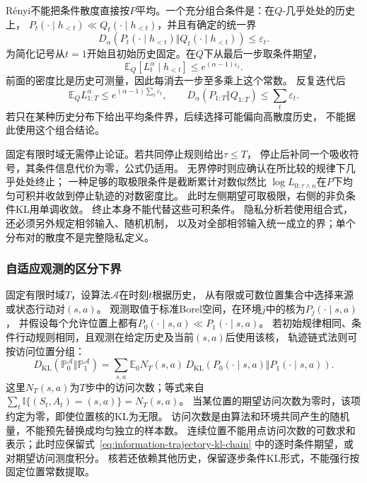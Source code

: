 Rényi不能把条件散度直接按\(P\)平均。一个充分组合条件是：在\(Q\)-几乎处处的历史上，
\(P_t(\cdot\mid h_{<t})\ll Q_t(\cdot\mid h_{<t})\)，并且有确定的统一界
\[
  D_\alpha(P_t(\cdot\mid h_{<t})\Vert Q_t(\cdot\mid h_{<t}))
  \leq\varepsilon_t.
\]
为简化记号从\(t=1\)开始且初始历史固定。在\(Q\)下从最后一步取条件期望，
\[
  \mathbb E_Q[L_t^\alpha\mid h_{<t}]
       \leq e^{(\alpha-1)\varepsilon_t}.
\]
前面的密度比是历史可测量，因此每消去一步至多乘上这个常数。
反复迭代后
\[
  \mathbb E_Q L_{1:T}^{\alpha}
  \leq e^{(\alpha-1)\sum_t\varepsilon_t},\qquad
  D_\alpha(P_{1:T}\Vert Q_{1:T})\leq\sum_t\varepsilon_t.
\]
若只在某种历史分布下给出平均条件界，后续选择可能偏向高散度历史，
不能据此使用这个组合结论。

固定有限时域无需停止论证。若共同停止规则给出\(\tau\leq T\)，
停止后补同一个吸收符号，其条件信息代价为零，公式仍适用。
无界停时则应确认在所比较的规律下几乎处处终止；
一种足够的取极限条件是截断累计对数似然比
\(\log L_{0:\tau\wedge n}\)在\(P\)下均匀可积并收敛到停止轨迹的对数密度比。
此时左侧期望可取极限，右侧的非负条件KL用单调收敛。
终止本身不能代替这些可积条件。
隐私分析若使用组合式，还必须另外规定相邻输入、随机机制，
以及对全部相邻输入统一成立的界；单个分布对的散度不是完整隐私定义。

\subsubsection{自适应观测的区分下界}
\label{sec:information-adaptive-lower-bounds}

固定有限时域\(T\)，设算法\(\mathcal A\)在时刻\(t\)根据历史，
从有限或可数位置集合中选择来源或状态行动对\((s,a)\)。
观测取值于标准Borel空间，在环境\(j\)中的核为\(P_j(\cdot\mid s,a)\)，
并假设每个允许位置上都有\(P_0(\cdot\mid s,a)\ll P_1(\cdot\mid s,a)\)。
若初始规律相同、条件行动规则相同，且观测在给定历史及当前\((s,a)\)后使用该核，
轨迹链式法则可按访问位置分组：
\[
  D_{\mathrm{KL}}(\mathbb P_0^{\mathcal A}\Vert\mathbb P_1^{\mathcal A})
  =\sum_{s,a}\mathbb E_0N_T(s,a)\,
      D_{\mathrm{KL}}(P_0(\cdot\mid s,a)\Vert P_1(\cdot\mid s,a)).
\]
这里\(N_T(s,a)\)为\(T\)步中的访问次数；等式来自
\(\sum_t\mathbb I\{(S_t,A_t)=(s,a)\}=N_T(s,a)\)。
当某位置的期望访问次数为零时，该项约定为零，即使位置核的KL为无限。
访问次数是由算法和环境共同产生的随机量，不能预先替换成均匀独立的样本数。
连续位置不能用点访问次数的可数求和表示；此时应保留式~\eqref{eq:information-trajectory-kl-chain}
中的逐时条件期望，或对期望访问测度积分。
核若还依赖其他历史，保留逐步条件KL形式，不能强行按固定位置常数提取。

